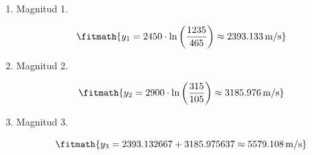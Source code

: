 \begin{enumerate}

\item Magnitud 1.

\[\fitmath{y_{1}=2450\cdot \ln\left(\frac{1235}{465}\right)\approx 2393.133\,\mathrm{m/s}}\]

\item Magnitud 2.

\[\fitmath{y_{2}=2900\cdot \ln\left(\frac{315}{105}\right)\approx 3185.976\,\mathrm{m/s}}\]

\item Magnitud 3.

\[\fitmath{y_{3}=2393.132667+3185.975637\approx 5579.108\,\mathrm{m/s}}\]

\end{enumerate}
